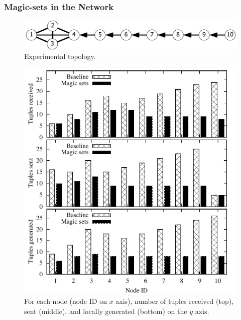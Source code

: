 \subsubsection{Magic-sets in the Network}

\begin{figure}
\centering
\includegraphics[scale=1.5]{figures/Topology}
\caption{Experimental topology.}
\label{fig:topo}
\end{figure}

\begin{figure}[htb]
\centering
\includegraphics{figures/magicNumbers}
\ssp
\caption{For each node (node ID on $x$ axis), number of tuples received
  (top), sent (middle), and locally generated (bottom) on the $y$ axis.}
\label{fig:magicresults}
\end{figure}


